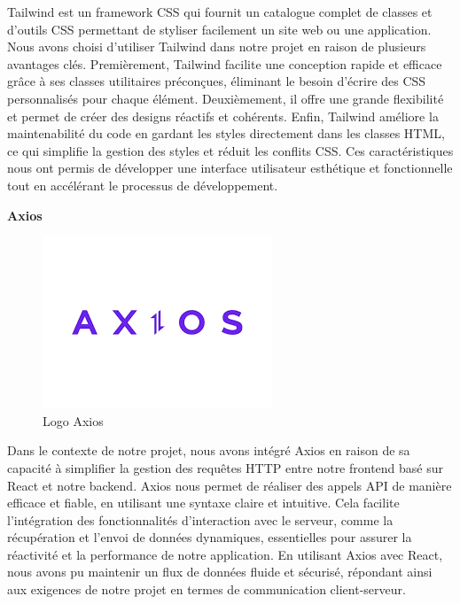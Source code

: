 Tailwind est un framework CSS qui fournit un catalogue complet 
de classes et d’outils CSS permettant de styliser facilement un 
site web ou une application. Nous avons choisi d'utiliser 
Tailwind dans notre projet en raison de plusieurs avantages 
clés. Premièrement, Tailwind facilite une conception rapide et 
efficace grâce à ses classes utilitaires préconçues, éliminant 
le besoin d'écrire des CSS personnalisés pour chaque élément. 
Deuxièmement, il offre une grande flexibilité et permet de créer 
des designs réactifs et cohérents. Enfin, Tailwind améliore 
la maintenabilité du code en gardant les styles directement dans 
les classes HTML, ce qui simplifie la gestion des styles et 
réduit les conflits CSS\cite{Tailwind}. Ces caractéristiques nous ont permis de 
développer une interface utilisateur esthétique et fonctionnelle 
tout en accélérant le processus de développement.
\newline

\large
\textbf{Axios}
\begin{figure}[h]
   \centering
   \includegraphics[scale=0.5]{Images/axios.png}
   \caption{Logo Axios\cite{Axios}}
\end{figure}

Dans le contexte de notre projet, nous avons intégré Axios en 
raison de sa capacité à simplifier la gestion des requêtes HTTP 
entre notre frontend basé sur React et notre backend. Axios nous 
permet de réaliser des appels API de manière efficace et fiable, 
en utilisant une syntaxe claire et intuitive. Cela facilite 
l'intégration des fonctionnalités d'interaction avec le serveur, 
comme la récupération et l'envoi de données dynamiques, 
essentielles pour assurer la réactivité et la performance de 
notre application. En utilisant Axios avec React, nous avons 
pu maintenir un flux de données fluide et sécurisé, répondant 
ainsi aux exigences de notre projet en termes de communication 
client-serveur.
\newline

